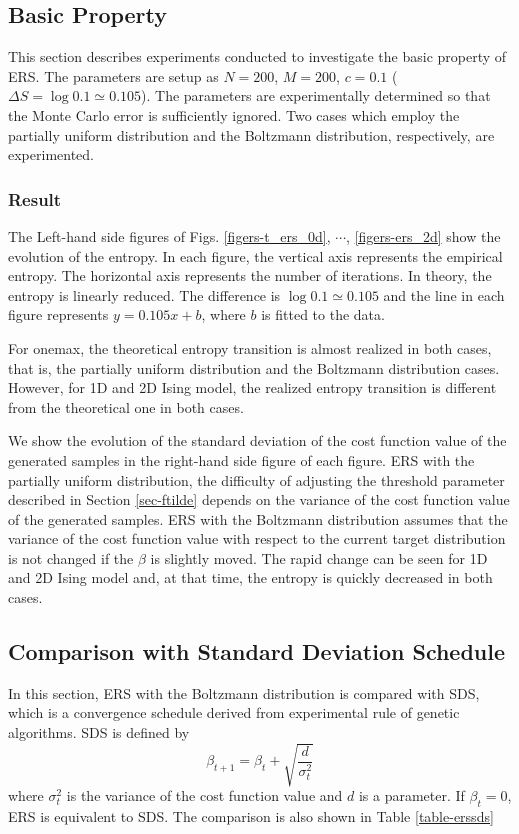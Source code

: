 \subsection{Basic Property}
This section describes experiments conducted to investigate
 the basic property of ERS.
The parameters are setup as 
$N=200$, $M=200$, $c=0.1$ ($\Delta S= \log 0.1 \simeq 0.105$).
The parameters are experimentally determined so that
the Monte Carlo error is sufficiently ignored.
Two cases which employ the partially uniform distribution and 
the Boltzmann distribution, respectively, are experimented.


\subsubsection{Result}
The Left-hand side figures of 
Figs. \ref{figers-t_ers_0d}, $\cdots $, \ref{figers-ers_2d} show
the evolution of the entropy. 
In each figure, the vertical axis represents
the empirical entropy.
The horizontal axis represents 
the number of iterations.
In theory, the entropy is linearly reduced.
The difference is $\log 0.1 \simeq 0.105$ and
the line in each figure represents $y=0.105 x + b$, where
$b$ is fitted to the data.

For onemax, 
the theoretical entropy transition is almost realized in both cases,
that is, the partially uniform distribution and the Boltzmann
distribution cases.
However, for 1D and 2D Ising model,
the realized entropy transition is different from the theoretical one
in both cases.


We show the evolution of the standard deviation of the cost function
value of the generated samples in the right-hand side figure of each figure.
ERS with the partially uniform distribution,
the difficulty of adjusting the threshold parameter described in 
Section \ref{sec-ftilde}
depends on 
the variance of the cost function value of the generated samples.
ERS with the Boltzmann distribution assumes that 
the variance of the cost function value with respect to the current
target distribution is not changed if the $\beta$ is slightly moved.
The rapid change can be seen for 1D and 2D Ising model
and, at that time, the entropy is quickly decreased in both cases.




\subsection{Comparison with Standard Deviation Schedule}
In this section, ERS with the Boltzmann distribution is compared with SDS,
which is a convergence schedule derived from experimental rule of
genetic algorithms.
SDS is defined by
\begin{equation}
 \beta_{t+1}=\beta_t+\sqrt{\frac{d}{\sigma^2_t}}
\end{equation}
where $\sigma^2_t$ is the variance of the cost function value and
$d$ is a parameter.
If $\beta_t=0$, ERS is equivalent to SDS.
The comparison is also shown in Table \ref{table-erssds}

